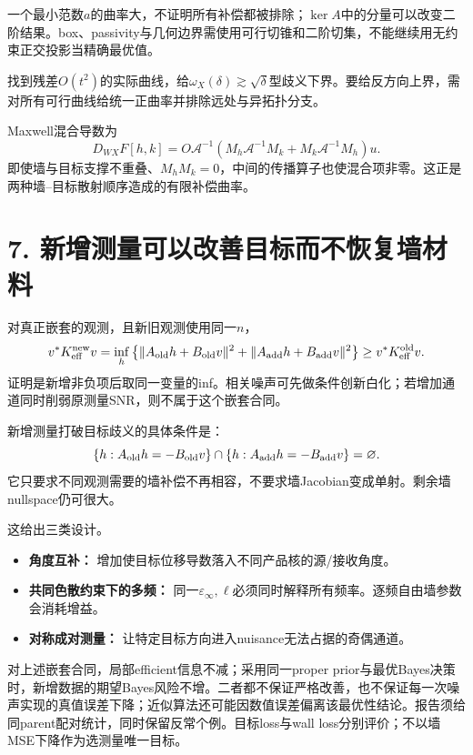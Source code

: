 \documentclass[
  10pt,
  a4paper,
]{article}
\providecommand{\tightlist}{%
  \setlength{\itemsep}{0pt}\setlength{\parskip}{0pt}}
\providecommand{\tightlist}{\setlength{\itemsep}{1pt}\setlength{\parskip}{1pt}}
\begin{document}
一个最小范数\(a\)的曲率大，不证明所有补偿都被排除；\(\ker A\)中的分量可以改变二阶结果。box、passivity与几何边界需使用可行切锥和二阶切集，不能继续用无约束正交投影当精确最优值。

找到残差\(O(t^2)\)的实际曲线，给\(\omega_X(\delta)\gtrsim\sqrt\delta\)型歧义下界。要给反方向上界，需对所有可行曲线给统一正曲率并排除远处与异拓扑分支。

Maxwell混合导数为 \[
D_{WX}F[h,k]
=O\mathcal A^{-1}
(M_h\mathcal A^{-1}M_k+M_k\mathcal A^{-1}M_h)u.
\]
即使墙与目标支撑不重叠、\(M_hM_k=0\)，中间的传播算子也使混合项非零。这正是两种墙--目标散射顺序造成的有限补偿曲率。

\hypertarget{ux65b0ux589eux6d4bux91cfux53efux4ee5ux6539ux5584ux76eeux6807ux800cux4e0dux6062ux590dux5899ux6750ux6599}{%
\section{7.
新增测量可以改善目标而不恢复墙材料}\label{ux65b0ux589eux6d4bux91cfux53efux4ee5ux6539ux5584ux76eeux6807ux800cux4e0dux6062ux590dux5899ux6750ux6599}}

对真正嵌套的观测，且新旧观测使用同一\(n\)， \[
v^*K_{\rm eff}^{\rm new}v
=\inf_h\left\{
\|A_{\rm old}h+B_{\rm old}v\|^2+
\|A_{\rm add}h+B_{\rm add}v\|^2
\right\}
\ge v^*K_{\rm eff}^{\rm old}v.
\]
证明是新增非负项后取同一变量的inf。相关噪声可先做条件创新白化；若增加通道同时削弱原测量SNR，则不属于这个嵌套合同。

新增测量打破目标歧义的具体条件是： \[
\{h:A_{\rm old}h=-B_{\rm old}v\}
\cap
\{h:A_{\rm add}h=-B_{\rm add}v\}
=\varnothing.
\]
它只要求不同观测需要的墙补偿不再相容，不要求墙Jacobian变成单射。剩余墙nullspace仍可很大。

这给出三类设计。

\begin{itemize}
\tightlist
\item
  \textbf{角度互补：} 增加使目标位移导数落入不同产品核的源/接收角度。
\item
  \textbf{共同色散约束下的多频：}
  同一\(\varepsilon_\infty,\ell\)必须同时解释所有频率。逐频自由墙参数会消耗增益。
\item
  \textbf{对称成对测量：} 让特定目标方向进入nuisance无法占据的奇偶通道。
\end{itemize}

对上述嵌套合同，局部efficient信息不减；采用同一proper
prior与最优Bayes决策时，新增数据的期望Bayes风险不增。二者都不保证严格改善，也不保证每一次噪声实现的真值误差下降；近似算法还可能因数值误差偏离该最优性结论。报告须给同parent配对统计，同时保留反常个例。目标loss与wall
loss分别评价；不以墙MSE下降作为选测量唯一目标。
\end{document}
